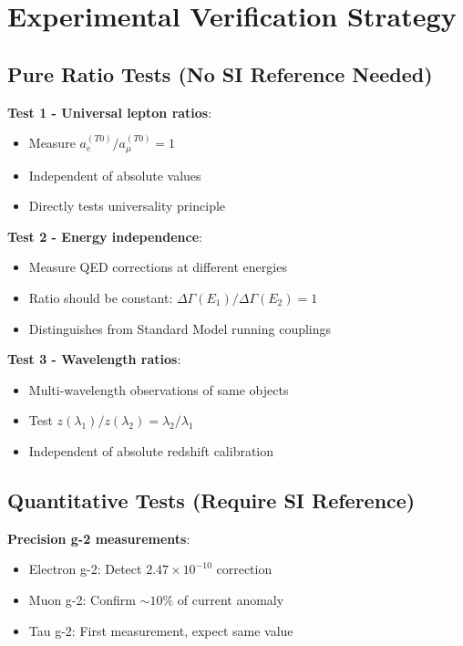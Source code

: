	\section{Experimental Verification Strategy}
	
	\subsection{Pure Ratio Tests (No SI Reference Needed)}
	
	\textbf{Test 1 - Universal lepton ratios}:
	\begin{itemize}
		\item Measure $a_e^{(T0)}/a_{\mu}^{(T0)} = 1$
		\item Independent of absolute values
		\item Directly tests universality principle
	\end{itemize}
	
	\textbf{Test 2 - Energy independence}:
	\begin{itemize}
		\item Measure QED corrections at different energies
		\item Ratio should be constant: $\Delta\Gamma(E_1)/\Delta\Gamma(E_2) = 1$
		\item Distinguishes from Standard Model running couplings
	\end{itemize}
	
	\textbf{Test 3 - Wavelength ratios}:
	\begin{itemize}
		\item Multi-wavelength observations of same objects
		\item Test $z(\lambda_1)/z(\lambda_2) = \lambda_2/\lambda_1$
		\item Independent of absolute redshift calibration
	\end{itemize}
	
	\subsection{Quantitative Tests (Require SI Reference)}
	
	\textbf{Precision g-2 measurements}:
	\begin{itemize}
		\item Electron g-2: Detect $2.47 \times 10^{-10}$ correction
		\item Muon g-2: Confirm $\sim 10\%$ of current anomaly
		\item Tau g-2: First measurement, expect same value
	\end{itemize}
	
